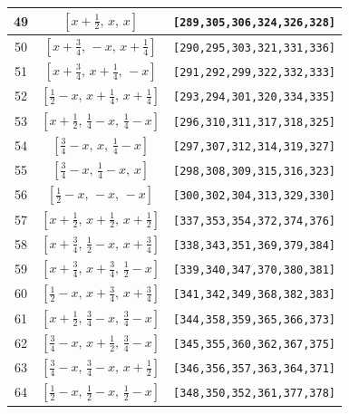 \documentclass[fleqn,8pt]{jsarticle}
\begin{document}
\begin{longtable}{ccc}
49 & $\left[ x + \frac{1}{2},\, x,\, x \right]$ & {\tt [289,305,306,324,326,328]} \\ \hline
50 & $\left[ x + \frac{3}{4},\, - x,\, x + \frac{1}{4} \right]$ & {\tt [290,295,303,321,331,336]} \\ \hline
51 & $\left[ x + \frac{3}{4},\, x + \frac{1}{4},\, - x \right]$ & {\tt [291,292,299,322,332,333]} \\ \hline
52 & $\left[ \frac{1}{2} - x,\, x + \frac{1}{4},\, x + \frac{1}{4} \right]$ & {\tt [293,294,301,320,334,335]} \\ \hline
53 & $\left[ x + \frac{1}{2},\, \frac{1}{4} - x,\, \frac{1}{4} - x \right]$ & {\tt [296,310,311,317,318,325]} \\ \hline
54 & $\left[ \frac{3}{4} - x,\, x,\, \frac{1}{4} - x \right]$ & {\tt [297,307,312,314,319,327]} \\ \hline
55 & $\left[ \frac{3}{4} - x,\, \frac{1}{4} - x,\, x \right]$ & {\tt [298,308,309,315,316,323]} \\ \hline
56 & $\left[ \frac{1}{2} - x,\, - x,\, - x \right]$ & {\tt [300,302,304,313,329,330]} \\ \hline
57 & $\left[ x + \frac{1}{2},\, x + \frac{1}{2},\, x + \frac{1}{2} \right]$ & {\tt [337,353,354,372,374,376]} \\ \hline
58 & $\left[ x + \frac{3}{4},\, \frac{1}{2} - x,\, x + \frac{3}{4} \right]$ & {\tt [338,343,351,369,379,384]} \\ \hline
59 & $\left[ x + \frac{3}{4},\, x + \frac{3}{4},\, \frac{1}{2} - x \right]$ & {\tt [339,340,347,370,380,381]} \\ \hline
60 & $\left[ \frac{1}{2} - x,\, x + \frac{3}{4},\, x + \frac{3}{4} \right]$ & {\tt [341,342,349,368,382,383]} \\ \hline
61 & $\left[ x + \frac{1}{2},\, \frac{3}{4} - x,\, \frac{3}{4} - x \right]$ & {\tt [344,358,359,365,366,373]} \\ \hline
62 & $\left[ \frac{3}{4} - x,\, x + \frac{1}{2},\, \frac{3}{4} - x \right]$ & {\tt [345,355,360,362,367,375]} \\ \hline
63 & $\left[ \frac{3}{4} - x,\, \frac{3}{4} - x,\, x + \frac{1}{2} \right]$ & {\tt [346,356,357,363,364,371]} \\ \hline
64 & $\left[ \frac{1}{2} - x,\, \frac{1}{2} - x,\, \frac{1}{2} - x \right]$ & {\tt [348,350,352,361,377,378]} \\
\end{longtable}
\renewcommand{\arraystretch}{1.2}
\end{document}
